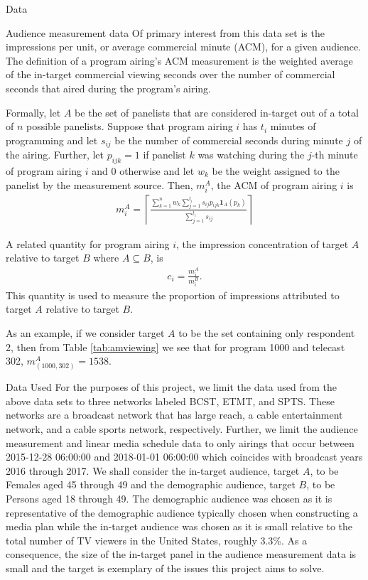 \begin{chapter}{Data}
\begin{section}{Audience measurement data}
  Of primary interest from this data set is the impressions per unit,
  or average commercial minute (ACM), for a given audience.
  The definition of a program airing's ACM measurement is the weighted average
  of the in-target commercial viewing seconds over the number of commercial seconds
  that aired during the program's airing.

  Formally, let $A$ be the set of panelists that are considered in-target out of a total of $n$ possible panelists.
  Suppose that program airing $i$ has $t_i$ minutes of programming and let
  $s_{ij}$ be the number of commercial seconds during minute $j$ of the airing.
  Further, let $p_{ijk} = 1$ if panelist $k$ was watching during the $j$-th minute of program airing $i$ and 0 otherwise
  and let $w_{k}$ be the weight assigned to the panelist by the measurement source. Then, $m_{i}^A$, the ACM of program airing $i$
  is
  \begin{align}\label{acm_def}
    m_{i}^A = \left\lceil\frac{\sum_{k=1}^n w_k \sum_{j=1}^{t_i} s_{ij} p_{ijk} \textbf{1}_A(p_{k})}{\sum_{j=1}^{t_i} s_{ij}}\right\rceil
  \end{align}

  A related quantity for program airing $i$, the impression concentration of target $A$ relative to target $B$ where $A \subseteq B$, is
  \begin{align*}
    c_i = \frac{m_{i}^A}{m_{i}^B}.
  \end{align*}
  This quantity is used to measure the proportion of impressions attributed to target $A$ relative to target $B$.

  As an example, if we consider target $A$ to be the set containing only respondent 2, then
  from Table \ref{tab:amviewing} we see that for program 1000 and telecast 302, $m_{(1000, 302)}^A = 1538$.
\end{section}

\begin{section}{Data Used}
  For the purposes of this project, we limit the data used from the above data sets
  to three networks labeled BCST, ETMT, and SPTS. These networks are a broadcast network
  that has large reach, a cable entertainment network, and a cable sports network, respectively.
  Further, we limit the audience measurement and linear media schedule data to only airings that occur
  between 2015-12-28 06:00:00 and 2018-01-01 06:00:00 which coincides with broadcast years 2016 through 2017.
  We shall consider the in-target audience, target $A$, to be Females aged 45 through 49 and the demographic audience, target $B$,
  to be Persons aged 18 through 49. The demographic audience was chosen as it is representative
  of the demographic audience typically chosen when constructing a media plan while the in-target
  audience was chosen as it is small relative to the total number of TV viewers in the United States, roughly 3.3\%.
  As a consequence, the size of the in-target panel in the audience measurement data is small and the target is
  exemplary of the issues this project aims to solve.


\end{section}
\end{chapter}
